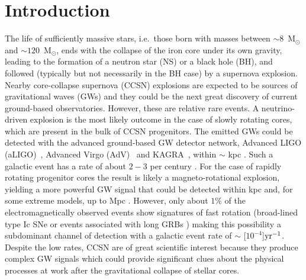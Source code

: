 
\section{Introduction}


The life of sufficiently massive stars, i.e.~those born with masses between $\sim 8$~M$_\odot$ and $\sim 120$~M$_\odot$, ends with the collapse of {the} iron core under {its} own gravity, leading {to} the formation of a neutron star {(NS)} or a black hole (BH), {and} followed (typically but not necessarily in the BH case) by {a supernova} explosion. Nearby core-collapse supernova (CCSN) explosions are expected to be sources of gravitational waves (GWs) and they could be 
the next great discovery of current ground-based observatories. However, these are relative rare events. A neutrino-driven explosion \citep{Bethe:1990} is the most likely outcome in the case of slowly rotating cores, which are present in the bulk of CCSN progenitors. The emitted GWs could be detected with the advanced ground-based GW detector network, Advanced LIGO (aLIGO)~\citep{TheLIGOScientific:2014jea}, Advanced Virgo (AdV)~\citep{TheVirgo:2014hva} and
KAGRA~\citep{Aso:2013eba}, within $\sim$ \unit[5]{kpc} \citep{Gossan:2016,TargetedSNSearchO12}. Such a galactic event has a rate of about $2-3$ per century \citep{Adams:2013,Rozwadowska:2021}.
For the case of rapidly rotating progenitor cores the result is likely a magneto-rotational explosion, yielding  a more powerful GW signal that could be detected within \unit[50]{kpc} and, for some extreme models, up to \unit[5--30]{Mpc} \citep{Gossan:2016,TargetedSNSearchO12}. However, only about $1\%$ of the electromagnetically observed events show signatures of fast rotation (broad-lined type Ic SNe \citep{Li:2011b} or events associated with long GRBs \citep{Chapman:2007}) making this possibility a subdominant channel of detection with a galactic event rate of $\sim$ \unit[$10^{-4}$]{$\rm {yr}^{-1}$}.
Despite the low rates, CCSN are of great scientific interest because they produce complex GW signals which could provide significant clues about the physical processes at work after the gravitational collapse of stellar cores. 


